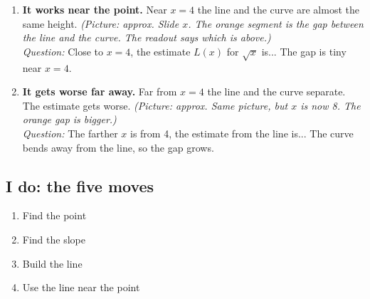 \documentclass[11pt]{article}
\begin{document}
\begin{enumerate}
\item \textbf{It works near the point.} Near $x=4$ the line and the curve are almost the same height. \textit{(Picture: approx. Slide $x$. The orange segment is the gap between the line and the curve. The readout says which is above.)}\\ \textit{Question:} Close to $x=4$, the estimate $L(x)$ for $\sqrt{x}$ is...  The gap is tiny near $x=4$.
\item \textbf{It gets worse far away.} Far from $x=4$ the line and the curve separate. The estimate gets worse. \textit{(Picture: approx. Same picture, but $x$ is now 8. The orange gap is bigger.)}\\ \textit{Question:} The farther $x$ is from 4, the estimate from the line is...  The curve bends away from the line, so the gap grows.
\end{enumerate}
\subsection*{I do: the five moves}\begin{enumerate}\item Find the point
\item Find the slope
\item Build the line
\item Use the line near the point\end{enumerate}
\end{document}

